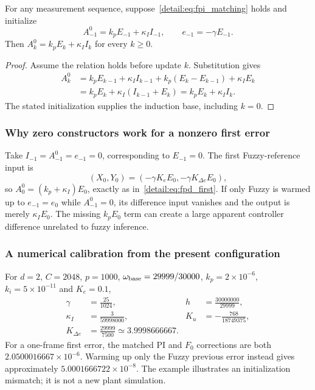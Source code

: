 \begin{btdproposition}
\label{detail:prop:fpi_equivalence}
For any measurement sequence, suppose~\eqref{detail:eq:fpi_matching} holds and
initialize
\begin{equation}
 A^0_{-1}=k_pE_{-1}+\kappa_I I_{-1},\qquad e_{-1}=-\gamma E_{-1}.
 \label{detail:eq:fpi_initialization}
\end{equation}
Then
$A^0_k=k_pE_k+\kappa_I I_k$ for every $k\ge0$.
\end{btdproposition}
\begin{proof}
Assume the relation holds before update $k$. Substitution gives
\begin{align*}
 A^0_k
 &=k_pE_{k-1}+\kappa_I I_{k-1}
   +k_p(E_k-E_{k-1})+\kappa_I E_k\\
 &=k_pE_k+\kappa_I(I_{k-1}+E_k)
 =k_pE_k+\kappa_I I_k.
\end{align*}
The stated initialization supplies the induction base, including $k=0$.
\end{proof}

\subsubsection{Why zero constructors work for a nonzero first error}
Take $I_{-1}=A^0_{-1}=e_{-1}=0$, corresponding to $E_{-1}=0$.
The first Fuzzy-reference input is
\[
 (X_0,Y_0)=(-\gamma K_eE_0,-\gamma K_{\Delta e}E_0),
\]
so
$A^0_0=(k_p+\kappa_I)E_0$, exactly as in~\eqref{detail:eq:fpd_first}.
If only Fuzzy is warmed up to $e_{-1}=e_0$ while $A^0_{-1}=0$, its
difference input vanishes and the output is merely $\kappa_I E_0$.
The missing $k_pE_0$ term can create a large apparent controller difference
unrelated to fuzzy inference.

\subsubsection{A numerical calibration from the present configuration}
For $d=2$, $C=2048$, $p=1000$, $\omega_{\rm base}=29999/30000$,
$k_p=2\times10^{-6}$, $k_i=5\times10^{-11}$ and $K_e=0.1$,
\begin{align}
 \gamma&=\frac{25}{1024},&h&=\frac{30000000}{29999},\nonumber\\
 \kappa_I&=\frac3{59998000},&
 K_u&=-\frac{768}{18749375},\nonumber\\
 K_{\Delta e}&=\frac{29999}{7500}
 \simeq3.9998666667.
 \label{detail:eq:fpd_example_gains}
\end{align}
For a one-frame first error, the matched PI and $F_0$ corrections are both
$2.0500016667\times10^{-6}$. Warming up only the Fuzzy previous error
instead gives approximately $5.0001666722\times10^{-8}$. The example
illustrates an initialization mismatch; it is not a new plant simulation.


